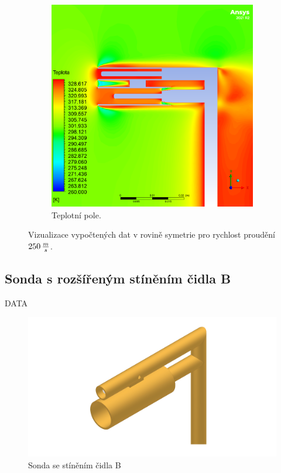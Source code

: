 \begin{figure}[ht!]
\begin{subfigure}{0.45\textwidth}
                \includegraphics[width=\textwidth]{400_SIMULACE_KONSTRUKCNICH_UPRAV/Vizualizace/sonda_se_stinenim_B_vizualizace_teplota.png}
                \caption{Teplotní pole.}
            \end{subfigure}
            \caption{Vizualizace vypočtených dat v rovině symetrie pro rychlost proudění $250 \, \frac{m}{s}$.}
            \label{fig:sonda-se-stinenim-B-vizualizace}
        \end{figure}
    
    \newpage
    \subsection{Sonda s rozšířeným stíněním čidla B}
        DATA
        
        \begin{figure}[ht!]
            \centering
            \includegraphics[width=\textwidth]{400_SIMULACE_KONSTRUKCNICH_UPRAV/Vykresy_rendery/Sonda_s_rozsirenym_stinenim_B.png}
            \caption{Sonda se stíněním čidla B}
            \label{fig:sonda-s-rozsirenym-stinenim-B}
        \end{figure}
        
